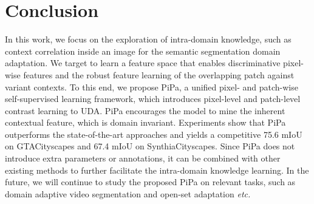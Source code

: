 \documentclass[10pt,twocolumn,letterpaper]{article}
\begin{document}
\section{Conclusion}
In this work, we focus on the exploration of intra-domain knowledge, such as context correlation inside an image for the semantic segmentation domain adaptation. We target to learn a feature space that enables discriminative pixel-wise features and the robust feature learning of the overlapping patch against variant contexts. 
To this end, we propose PiPa, a unified pixel- and patch-wise self-supervised learning framework, which introduces pixel-level and patch-level contrast learning to UDA. PiPa encourages the model to mine the inherent contextual feature, which is domain invariant.
Experiments show that PiPa outperforms the state-of-the-art approaches and yields a competitive 75.6 mIoU on GTACityscapes and 67.4 mIoU on SynthiaCityscapes. 
Since PiPa does not introduce extra parameters or annotations, it can be combined with other existing methods to further facilitate the intra-domain knowledge learning. In the future, we will continue to study the proposed PiPa on relevant tasks, such as domain adaptive video segmentation and open-set adaptation \emph{etc.} 


{\small


}
\end{document}
